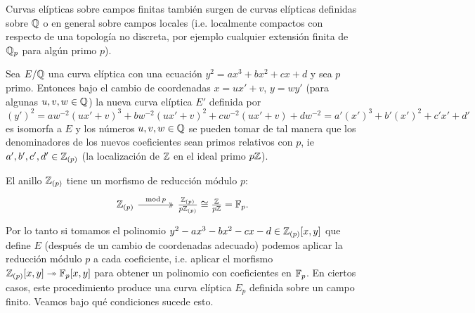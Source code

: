 Curvas el\'ipticas sobre campos finitas tambi\'en surgen de curvas el\'ipticas definidas sobre $\mathbb{Q}$
o en general sobre campos locales (i.e. localmente compactos con respecto de una topolog\'ia no
discreta, por ejemplo cualquier extensi\'on finita de $\mathbb{Q}_p$ para alg\'un primo $p$).

Sea $E/\mathbb{Q}$ una curva el\'iptica con una ecuaci\'on $y^2=ax^3+bx^2+cx+d$ y sea $p$ primo. Entonces
bajo el cambio de coordenadas $x=ux'+v$, $y=wy'$ (para algunas $u,v,w\in\mathbb{Q}$) la nueva curva
el\'iptica $E'$ definida por
\[
  (y')^2=aw^{-2}(ux'+v)^3+bw^{-2}(ux'+v)^2+cw^{-2}(ux'+v)+dw^{-2}=a'(x')^3+b'(x')^2+c'x'+d'
\]
es isomorfa a $E$ y los n\'umeros $u,v,w\in\mathbb{Q}$ se pueden tomar de tal manera que los denominadores
de los nuevos coeficientes sean primos relativos con $p$, ie $a',b',c',d'\in\mathbb{Z}_{(p)}$ (la
localizaci\'on de $\mathbb{Z}$ en el ideal primo $p\mathbb{Z}$). %

El anillo $\mathbb{Z}_{(p)}$ tiene un morfismo de reducci\'on m\'odulo $p$:
\[
  \begin{tikzcd}[column sep=large]
    \ZZ_{(p)} \arrow[r,two heads,"\mathrm{mod}\,p"] &
    \frac{\ZZ_{(p)}}{p\ZZ_{(p)}}\cong\frac{\ZZ}{p\ZZ}=\FF_p.
  \end{tikzcd}
\]
Por lo tanto si tomamos el polinomio $y^2-ax^3-bx^2-cx-d\in\mathbb{Z}_{(p)}[x,y]$ que define $E$
(despu\'es de un cambio de coordenadas adecuado) podemos aplicar la reducci\'on m\'odulo $p$ a cada
coeficiente, i.e. aplicar el morfismo $\mathbb{Z}_{(p)}[x,y]\twoheadrightarrow\mathbb{F}_p[x,y]$ para obtener un polinomio con
coeficientes en $\mathbb{F}_p$. En ciertos casos, este procedimiento produce una curva el\'iptica $E_p$
definida sobre un campo finito. Veamos bajo qu\'e condiciones sucede esto.

